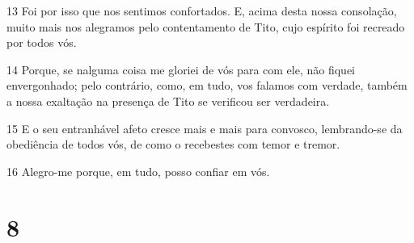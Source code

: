 \par 13 Foi por isso que nos sentimos confortados. E, acima desta nossa consolação, muito mais nos alegramos pelo contentamento de Tito, cujo espírito foi recreado por todos vós.
\par 14 Porque, se nalguma coisa me gloriei de vós para com ele, não fiquei envergonhado; pelo contrário, como, em tudo, vos falamos com verdade, também a nossa exaltação na presença de Tito se verificou ser verdadeira.
\par 15 E o seu entranhável afeto cresce mais e mais para convosco, lembrando-se da obediência de todos vós, de como o recebestes com temor e tremor.
\par 16 Alegro-me porque, em tudo, posso confiar em vós.

\chapter{8}

